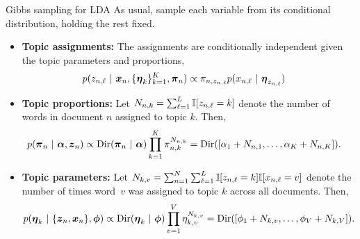 \documentclass[aspectratio=169]{beamer}
\begin{document}
\begin{frame}{Gibbs sampling for LDA}
\label{slide:gibbs}
As usual, sample each variable from its conditional distribution, holding the rest fixed.

\begin{itemize}
    \item<1-> \textbf{Topic assignments:} The assignments are conditionally independent given the topic parameters and proportions,
    \begin{align}
        p(z_{n,\ell} ~\vert~ \boldsymbol{x}_n, \{\boldsymbol{\eta}_k\}_{k=1}^K, \boldsymbol{\pi}_n) &\propto \pi_{n, z_{n, \ell}} p(x_{n, \ell} ~\vert~ \boldsymbol{\eta}_{z_{n, \ell}})
    \end{align}
    
    \item<2-> \textbf{Topic proportions: } Let $N_{n,k} = \sum_{\ell=1}^L \mathbb{I}[z_{n,\ell} = k]$ denote the number of words in document $n$ assigned to topic $k$. Then,
    \begin{align}
        p(\boldsymbol{\pi}_n ~\vert~ \boldsymbol{\alpha}, \boldsymbol{z}_n) &\propto \mathrm{Dir}(\boldsymbol{\pi}_n ~\vert~ \boldsymbol{\alpha}) \prod_{k=1}^K \pi_{n,k}^{N_{n,k}} = \mathrm{Dir}([\alpha_1 + N_{n,1}, \ldots, \alpha_K + N_{n,K}]).
    \end{align}
    
    \item<3-> \textbf{Topic parameters: } Let $N_{k,v} = \sum_{n=1}^N \sum_{\ell=1}^L \mathbb{I}[z_{n,\ell}=k] \mathbb{I}[x_{n,\ell}=v]$ denote the number of times word~$v$ was assigned to topic $k$ across all documents. Then,
\begin{align}
    p(\boldsymbol{\eta}_k ~\vert~ \{\boldsymbol{z}_n, \boldsymbol{x}_n\}, \boldsymbol{\phi}) &\propto
    \mathrm{Dir}(\boldsymbol{\eta}_k ~\vert~ \boldsymbol{\phi}) \prod_{v=1}^V \eta_{k,v}^{N_{k,v}} = \mathrm{Dir}([\phi_1 + N_{k,v}, \ldots, \phi_V + N_{k,V}]).
\end{align}

\end{itemize}
\end{frame}
\end{document}
